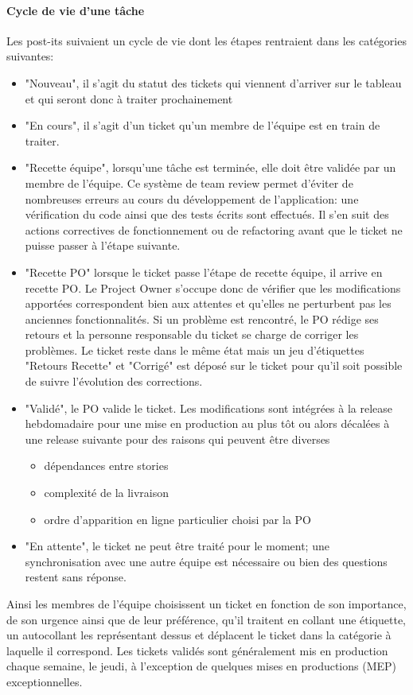 \paragraph{Cycle de vie d'une tâche}
Les post-its suivaient un cycle de vie dont les étapes rentraient dans les catégories suivantes:
\begin{itemize}
  \item "Nouveau", il s'agit du statut des tickets qui viennent d'arriver sur le tableau et qui seront donc à traiter prochainement
  \item "En cours", il s'agit d'un ticket qu'un membre de l'équipe est en train de traiter.
  \item "Recette équipe", lorsqu'une tâche est terminée, elle doit être validée par un membre de l'équipe.
  Ce système de team review permet d'éviter de nombreuses erreurs au cours du développement de l'application: une vérification du code ainsi que des tests écrits sont effectués.
  Il s'en suit des actions correctives de fonctionnement ou de refactoring avant que le ticket ne puisse passer à l'étape suivante.
  \item "Recette PO" lorsque le ticket passe l'étape de recette équipe, il arrive en recette PO.
  Le Project Owner s'occupe donc de vérifier que les modifications apportées correspondent bien aux attentes et qu'elles ne perturbent pas les anciennes fonctionnalités.
  Si un problème est rencontré, le PO rédige ses retours et la personne responsable du ticket se charge de corriger les problèmes.
  Le ticket reste dans le même état mais un jeu d'étiquettes "Retours Recette" et "Corrigé" est déposé sur le ticket pour qu'il soit possible de suivre l'évolution des corrections.
  \item "Validé", le PO valide le ticket.
  Les modifications sont intégrées à la release hebdomadaire pour une mise en production au plus tôt ou alors décalées à une release suivante pour des raisons qui peuvent être diverses
  \begin{itemize}
    \item dépendances entre stories
    \item complexité de la livraison
    \item ordre d'apparition en ligne particulier choisi par la PO
  \end{itemize}
  \item "En attente", le ticket ne peut être traité pour le moment; une synchronisation avec une autre équipe est nécessaire ou bien des questions restent sans réponse.
\end{itemize}
Ainsi les membres de l'équipe choisissent un ticket en fonction de son importance, de son urgence ainsi que de leur préférence, qu'il traitent en collant une étiquette, un autocollant les représentant dessus et déplacent le ticket dans la catégorie à laquelle il correspond.
Les tickets validés sont généralement mis en production chaque semaine, le jeudi, à l'exception de quelques mises en productions (MEP) exceptionnelles.
